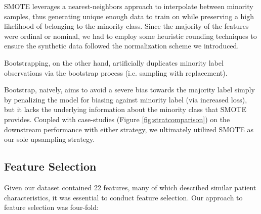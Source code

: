 \documentclass[conference]{IEEEtran}
\begin{document}
\begin{enumerate}[label=\roman*.]
        SMOTE leverages a nearest-neighbors approach to interpolate between minority samples, thus generating unique enough data to train on while preserving a high likelihood of belonging to the minority class. Since the majority of the features were ordinal or nominal, we had to employ some heuristic rounding techniques to ensure the synthetic data followed the normalization scheme we introduced.
        
        Bootstrapping, on the other hand, artificially duplicates minority label observations via the bootstrap process (i.e. sampling with replacement).
        
        Bootstrap, naively, aims to avoid a severe bias towards the majority label simply by penalizing the model for biasing against minority label (via increased loss), but it lacks the underlying information about the minority class that SMOTE provides. Coupled with case-studies (Figure \ref{fig:stratcomparison}) on the downstream performance with either strategy, we ultimately utilized SMOTE as our sole upsampling strategy.
    \end{enumerate}

    \subsection{Feature Selection}
    Given our dataset contained 22 features, many of which described similar patient characteristics, it was essential to conduct feature selection. Our approach to feature selection was four-fold:
    
\end{document}
